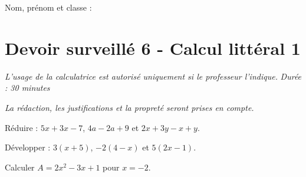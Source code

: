 \documentclass[a4paper,10pt]{report}
\begin{document}
\pagestyle{empty}
\noindent Nom, prénom et classe : \dotfill

\section*{Devoir surveillé 6 - Calcul littéral 1}

\noindent \textit{L'usage de la calculatrice est autorisé uniquement si le professeur l'indique.} \hfill \textit{Durée : 30 minutes}

\medskip
\noindent \textit{La rédaction, les justifications et la propreté seront prises en compte.}


\begin{ex}[Réduire]
Réduire : $5x+3x-7$, $4a-2a+9$ et $2x+3y-x+y$.
\medskip\noindent\grandscarreaux{\linewidth}{3cm}
\end{ex}
\begin{ex}[Développer]
Développer : $3(x+5)$, $-2(4-x)$ et $5(2x-1)$.
\medskip\noindent\grandscarreaux{\linewidth}{4cm}
\end{ex}
\begin{ex}[Substituer]
Calculer $A=2x^2-3x+1$ pour $x=-2$.
\medskip\noindent\grandscarreaux{\linewidth}{3cm}
\end{ex}
\end{document}
